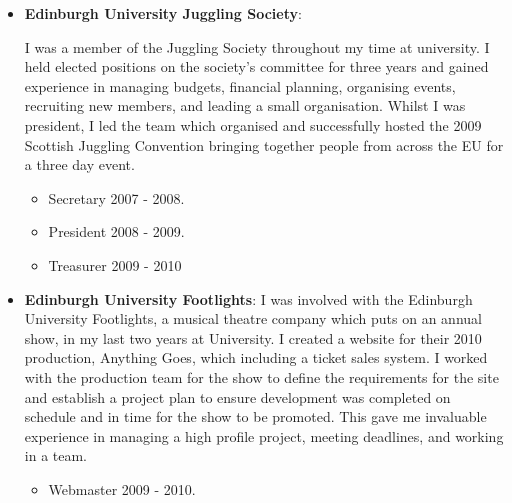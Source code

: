 \documentclass[a4paper]{article}
\begin{document}
\begin{itemize}
\item {\bf Edinburgh University Juggling Society}: 

I was a member of the Juggling Society throughout my time at university.  I held elected positions on the society's committee for three years and gained experience in managing budgets, financial planning, organising events, recruiting new members, and leading a small organisation.  Whilst I was president, I led the team which organised and successfully hosted the 2009 Scottish Juggling Convention bringing together people from across the EU for a three day event.
\begin{itemize}
\item Secretary 2007 - 2008.
\item President 2008 - 2009.
\item Treasurer 2009 - 2010
\end{itemize}

\item {\bf Edinburgh University Footlights}: 
I was involved with the Edinburgh University Footlights, a musical theatre company which puts on an annual show, in my last two years at University.  I created a website for their 2010 production, Anything Goes, which including a ticket sales system.  I worked with the production team for the show to define the requirements for the site and establish a project plan to ensure development was completed on schedule and in time for the show to be promoted.  This gave me invaluable experience in managing a high profile project, meeting deadlines, and working in a team.

\begin{itemize}
\item Webmaster 2009 - 2010.
\end{itemize}
\end{itemize}
\end{document}
